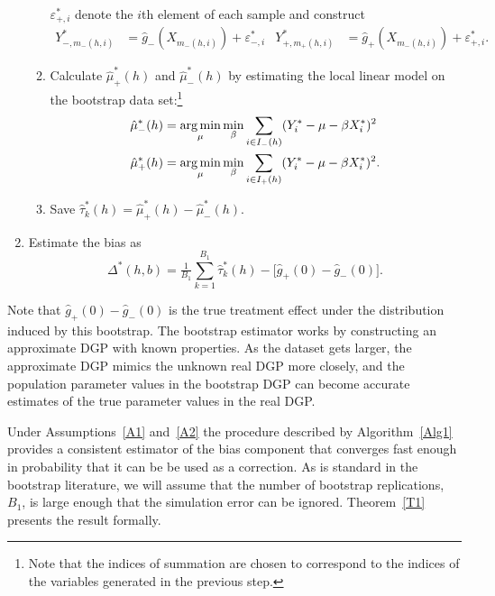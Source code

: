 \documentclass[12pt,fleqn]{article}
\begin{document}
\begin{algorithm}
\begin{enumerate}
\begin{enumerate}
      $\varepsilon_{+,i}^{*}$ denote the $i$th element of each sample and
      construct
      \begin{align*}
        Y_{-,m_-(h,i)}^* &= \hat g_-(X_{m_-(h,i)}) + \varepsilon_{-,i}^{*} &
        Y_{+,m_+(h,i)}^* &= \hat g_+(X_{m_-(h,i)}) + \varepsilon_{+,i}^{*}.
      \end{align*}
    \item Calculate $\hat\mu_+^*(h)$ and $\hat\mu_-^*(h)$ by estimating the
      local linear model on the bootstrap data set:\footnote{%
        Note that the indices of summation are chosen to correspond to the
        indices of the variables generated in the previous step.} %
      \begin{align*}
        \hat\mu_-^*(h)
        &= \argmin_{\mu} \min_{\beta} \ssum[-]{i}{h}
          (Y_i^* - \mu - \beta X_i^*)^2 \\
        \hat\mu_+^*(h)
        &= \argmin_{\mu} \min_{\beta} \ssum[+]{i}{h}
          (Y_i^* - \mu - \beta X_i^*)^2.
      \end{align*}
    \item Save $\hat\tau^*_k(h) = \hat\mu_+^*(h) - \hat\mu_-^*(h)$.
    \end{enumerate}
  \item Estimate the bias as
    \begin{equation*}
      \Delta^*(h,b) = \tfrac{1}{B_1} \sum_{k=1}^{B_1} \hat\tau^*_k(h) -
      \big[\hat g_+(0) - \hat g_-(0)\big].
    \end{equation*}
  \end{enumerate}
\end{algorithm}
Note that $\hat g_+(0) - \hat g_-(0)$ is the true treatment effect under the
distribution induced by this bootstrap. The bootstrap estimator works by
constructing an approximate DGP with known properties. As the dataset gets
larger, the approximate DGP mimics the unknown real DGP more closely, and the
population parameter values in the bootstrap DGP can become accurate estimates
of the true parameter values in the real DGP.

Under Assumptions~\ref{A1} and~\ref{A2} the procedure described by
Algorithm~\ref{Alg1} provides a consistent estimator of the bias component that
converges fast enough in probability that it can be be used as a correction. As
is standard in the bootstrap literature, we will assume that the number of
bootstrap replications, $B_{1}$, is large enough that the simulation error can
be ignored. Theorem~\ref{T1} presents the result formally.
\end{document}
